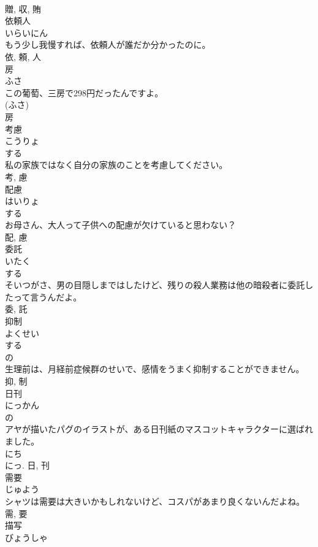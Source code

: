 \documentclass[8pt]{extreport}
\begin{document}
\begin{CJK}{UTF8}{min}
\\	贈, 収, 賄	
\\	依頼人	
\\	いらいにん	
\\	もう少し我慢すれば、依頼人が誰だか分かったのに。	
\\	依, 頼, 人	
\\	房	
\\	ふさ	
\\	この葡萄、三房で298円だったんですよ。	
\\	(ふさ) 
\\	房	
\\	考慮	
\\	こうりょ	
\\	する 
\\	私の家族ではなく自分の家族のことを考慮してください。	
\\	考, 慮	
\\	配慮	
\\	はいりょ	
\\	する 
\\	お母さん、大人って子供への配慮が欠けていると思わない？	
\\	配, 慮	
\\	委託	
\\	いたく	
\\	する 
\\	そいつがさ、男の目隠しまではしたけど、残りの殺人業務は他の暗殺者に委託したって言うんだよ。	
\\	委, 託	
\\	抑制	
\\	よくせい	
\\	する 
\\	の 
\\	生理前は、月経前症候群のせいで、感情をうまく抑制することができません。	
\\	抑, 制	
\\	日刊	
\\	にっかん	
\\	の 
\\	アヤが描いたパグのイラストが、ある日刊紙のマスコットキャラクターに選ばれました。	
\\	にち 
\\	にっ.	日, 刊	
\\	需要	
\\	じゅよう	
\\	シャツは需要は大きいかもしれないけど、コスパがあまり良くないんだよね。	
\\	需, 要	
\\	描写	
\\	びょうしゃ	

\end{CJK}
\end{document}
